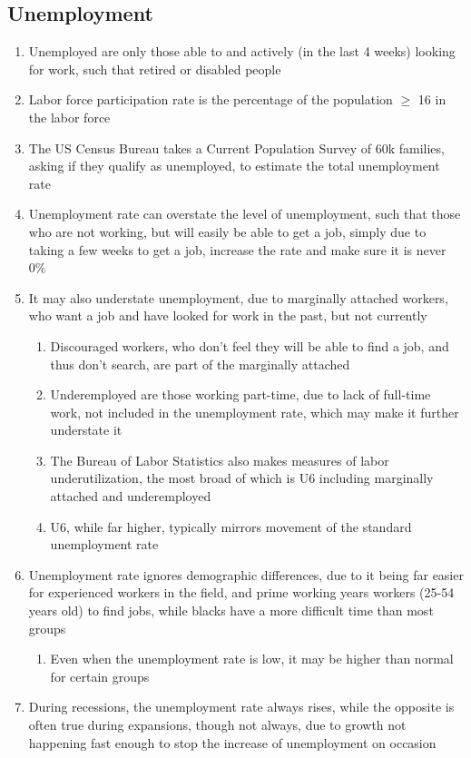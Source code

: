 \documentclass[11 pt, twoside]{article}
\begin{document}
\subsection{Unemployment}
\begin{enumerate}
\item Unemployed are only those able to and actively (in the last 4 weeks) looking for work, such that retired or disabled people
\item Labor force participation rate is the percentage of the population $\geq$ 16 in the labor force
\item The US Census Bureau takes a Current Population Survey of 60k families, asking if they qualify as unemployed, to estimate the total unemployment rate
\item Unemployment rate can overstate the level of unemployment, such that those who are not working, but will easily be able to get a job, simply due to taking a few weeks to get a job, increase the rate and make sure it is never 0\%
\item It may also understate unemployment, due to marginally attached workers, who want a job and have looked for work in the past, but not currently
\begin{enumerate}
\item Discouraged workers, who don't feel they will be able to find a job, and thus don't search, are part of the marginally attached
\item Underemployed are those working part-time, due to lack of full-time work, not included in the unemployment rate, which may make it further understate it
\item The Bureau of Labor Statistics also makes measures of labor underutilization, the most broad of which is U6 including marginally attached and underemployed
\item U6, while far higher, typically mirrors movement of the standard unemployment rate
\end{enumerate}
\item Unemployment rate ignores demographic differences, due to it being far easier for experienced workers in the field, and prime working years workers (25-54 years old) to find jobs, while blacks have a more difficult time than most groups
\begin{enumerate}
\item Even when the unemployment rate is low, it may be higher than normal for certain groups
\end{enumerate}
\item During recessions, the unemployment rate always rises, while the opposite is often true during expansions, though not always, due to growth not happening fast enough to stop the increase of unemployment on occasion

\end{enumerate}
\end{document}

